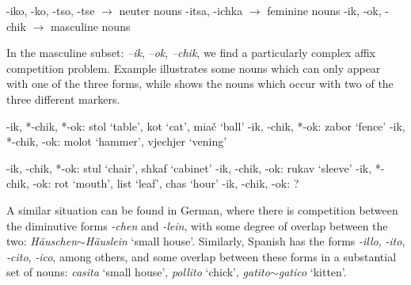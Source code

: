 \begin{exe}
    \ex \label{sys-dim}
    \begin{xlist}
        \ex -iko, -ko, -tso, -tse $\rightarrow$ neuter nouns
        \ex -itsa, -ichka $\rightarrow$ feminine nouns
        \ex -ik, -ok, -chik $\rightarrow$ masculine nouns
    \end{xlist}
\end{exe}

\largerpage
In the masculine subset: \textit{–ik}, \textit{–ok}, \textit{–chik}, we find a particularly complex affix competition problem. Example  illustrates some nouns which can only appear with one of the three forms, while  shows the nouns which occur with two of the three different markers.

\begin{exe}
    \ex \label{ikchikok-single}
    \begin{xlist}
        \ex -ik, *-chik, *-ok: stol `table', kot `cat', miač `ball'
        \ex *-ik, -chik, *-ok: zabor `fence'
        \ex *-ik, *-chik, -ok: molot `hammer', vjechjer `vening'
    \end{xlist}
\end{exe}

\begin{exe}
    \ex \label{ikchikok-multiple}
    \begin{xlist}
        \ex -ik, -chik, *-ok: stul `chair', shkaf `cabinet'
        \ex *-ik, -chik, -ok: rukav `sleeve'
        \ex -ik, *-chik, -ok: rot `mouth', list  `leaf', chas `hour'
        \ex -ik, -chik, -ok: ?
    \end{xlist}
\end{exe}

A similar situation can be found in German, where there is competition between the diminutive forms \textit{-chen} and \textit{-lein}, with some degree of overlap between the two: \textit{Häuschen}$\sim$\textit{Häuslein} `small house'. Similarly, Spanish has the forms \textit{-illo}, \textit{-ito}, \textit{-cito}, \textit{-ico}, among others, and some overlap between these forms in a substantial set of nouns: \textit{casita} `small house', \textit{pollito} `chick', \textit{gatito}$\sim$\textit{gatico} `kitten'.

